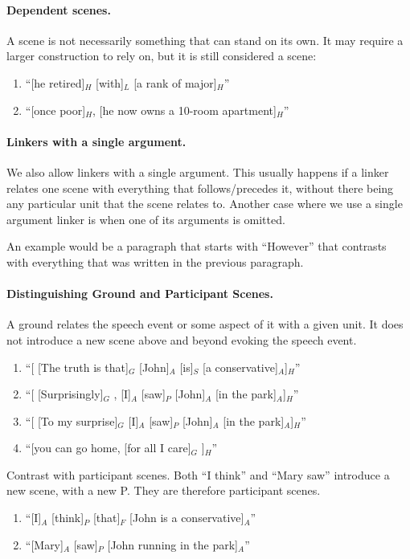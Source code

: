 \documentclass[11pt]{article}
\newcommand{\be}{\begin{enumerate}}
\newcommand{\ee}{\end{enumerate}}
\begin{document}
\paragraph{Dependent scenes.}
A scene is not necessarily something that can stand on its own. It may require
a larger construction to rely on, but it is still considered a scene:
\be
\item
``[he retired]$_H$ [with]$_L$ [a rank of major]$_H$''
\item
``[once poor]$_H$, [he now owns a 10-room apartment]$_H$''
\ee

\paragraph{Linkers with a single argument.}
We also allow linkers with a single argument. This usually happens if a linker relates one scene with everything that follows/precedes it, without there being any particular unit that the scene relates to. Another case where we use a single argument linker is when one of its arguments is omitted.

An example would be a paragraph that starts with ``However'' that contrasts with everything that was written in the previous paragraph.

\paragraph{Distinguishing Ground and Participant Scenes.}
A ground relates the speech event or some aspect of it with a given unit. It does not introduce a new scene above and beyond evoking the speech event.
\be
\item
``[ [The truth is that]$_G$ [John]$_A$ [is]$_S$ [a conservative]$_A$]$_H$''
\item
``[ [Surprisingly]$_G$ , [I]$_A$ [saw]$_P$ [John]$_A$ [in the park]$_A$]$_H$''
\item
``[ [To my surprise]$_G$ [I]$_A$ [saw]$_P$ [John]$_A$ [in the park]$_A$]$_H$''
\item
``[you can go home, [for all I care]$_G$ ]$_H$''
\ee
Contrast with participant scenes. Both ``I think'' and ``Mary saw'' introduce a new scene, with a new P. They are therefore participant scenes.
\be \item
``[I]$_A$ [think]$_P$ [that]$_F$ [John is a conservative]$_A$''
\item
``[Mary]$_A$ [saw]$_P$ [John running in the park]$_A$''
\ee
\end{document}
